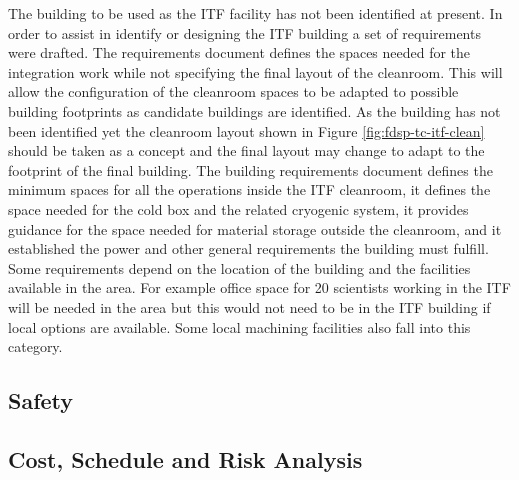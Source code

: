 The building to be used as the ITF facility has not been identified at present. In order to assist in identify or designing the ITF building a set of requirements were drafted. The requirements document defines the spaces needed for the integration work while not specifying the final layout of the cleanroom. This will allow the configuration of the cleanroom spaces to be adapted to possible building footprints as candidate buildings are identified. As the building has not been identified yet the cleanroom layout shown in Figure \ref{fig:fdsp-tc-itf-clean} should be taken as a concept and the final layout may change to adapt to the footprint of the final building. The building requirements document\cite{docdb-11500}  defines the minimum spaces for all the operations inside the ITF cleanroom, it defines the space needed for the cold box and the related cryogenic system, it provides guidance for the space needed for material storage outside the cleanroom, and it established the power and other general requirements the building must fulfill. Some requirements depend on the location of the building and the facilities available in the area. For example office space for 20 scientists working in the ITF will be needed in the area but  this would not need to be in the ITF building if local options are available. Some local machining facilities also fall into this category. 

\subsection{Safety}
\label{sec:fdsp-tc-itf-safety}


\subsection{Cost, Schedule and Risk Analysis}
\label{sec:fdsp-tc-itf-cost}

